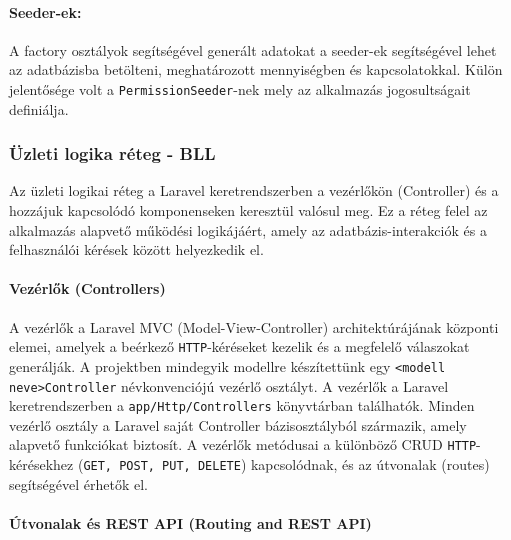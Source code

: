 \paragraph{Seeder-ek:} A factory osztályok segítségével generált adatokat a seeder-ek segítségével lehet az adatbázisba betölteni, meghatározott mennyiségben és kapcsolatokkal. Külön jelentősége volt a \texttt{PermissionSeeder}-nek mely az alkalmazás jogosultságait definiálja.

\subsubsection{Üzleti logika réteg - BLL}

Az üzleti logikai réteg a Laravel keretrendszerben a vezérlőkön (Controller) és a hozzájuk kapcsolódó komponenseken keresztül valósul meg. Ez a réteg felel az alkalmazás alapvető működési logikájáért, amely az adatbázis-interakciók és a felhasználói kérések között helyezkedik el.
\paragraph{Vezérlők (Controllers)}

A vezérlők a Laravel MVC (Model-View-Controller) architektúrájának központi elemei, amelyek a beérkező \texttt{HTTP}-kéréseket kezelik és a megfelelő válaszokat generálják.
A projektben mindegyik modellre készítettünk egy \texttt{<modell neve>Controller} névkonvenciójú vezérlő osztályt. A vezérlők a Laravel keretrendszerben a \texttt{app/Http/Controllers} könyvtárban találhatók. Minden vezérlő osztály a Laravel saját Controller bázisosztályból származik, amely alapvető funkciókat biztosít. A vezérlők metódusai a különböző CRUD \texttt{HTTP}-kérésekhez (\texttt{GET, POST, PUT, DELETE}) kapcsolódnak, és az útvonalak (routes) segítségével érhetők el.


\paragraph{Útvonalak és REST API (Routing and REST API)}

